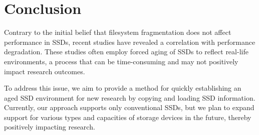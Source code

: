 \section{Conclusion}\label{s:conclusion}

Contrary to the initial belief that filesystem fragmentation does not affect performance in SSDs, recent studies have revealed a correlation with performance degradation.
These studies often employ forced aging of SSDs to reflect real-life environments, a process that can be time-consuming and may not positively impact research outcomes.

To address this issue, we aim to provide a method for quickly establishing an aged SSD environment for new research by copying and loading SSD information.
Currently, our approach supports only conventional SSDs, but we plan to expand support for various types and capacities of storage devices in the future, thereby positively impacting research.
